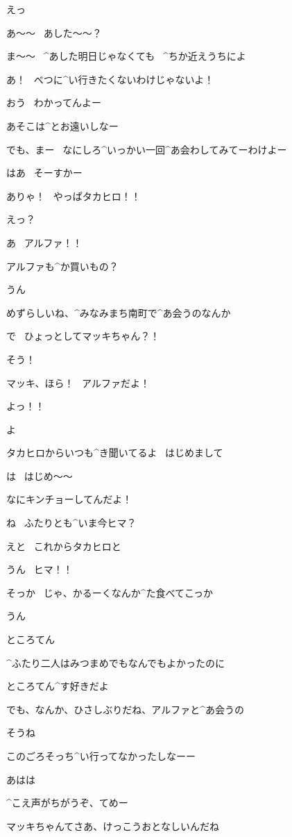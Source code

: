 \M えっ

\M あ〜〜
\ あした〜〜？

\page
\T ま〜〜
\ ^{あした}{明日}じゃなくても
\ ^{ちか}{近}えうちによ

\M あ！
\ べつに^{い}{行}きたくないわけじゃないよ！

\T おう
\ わかってんよー

\T あそこは^{とお}{遠}いしなー

\page
\T でも、まー
\ なにしろ^{いっかい}{一回}^{あ}{会}わしてみてーわけよー

\M はあ
\ そーすかー

\page
\A ありゃ！
\ やっぱタカヒロ！！

\T えっ？

\T あ
\ アルファ！！

\page
\T アルファも^{か}{買}いもの？

\A うん

\A めずらしいね、^{みなみまち}{南町}で^{あ}{会}うのなんか

\A で
\ ひょっとしてマッキちゃん？！

\T そう！

\T マッキ、ほら！
\ アルファだよ！

\page
\M よっ！！

\A よ

\page
\A タカヒロからいつも^{き}{聞}いてるよ
\ はじめまして

\M は
\ はじめ〜〜

\T なにキンチョーしてんだよ！

\A ね
\ ふたりとも^{いま}{今}ヒマ？

\M えと
\ これからタカヒロと

\T うん
\ ヒマ！！

\A そっか
\ じゃ、かるーくなんか^{た}{食}べてこっか

\T うん

\page
\Sign ところてん

\A ^{ふたり}{二人}はみつまめでもなんでもよかったのに

\T ところてん^{す}{好}きだよ

\T でも、なんか、ひさしぶりだね、アルファと^{あ}{会}うの

\A そうね

\T このごろそっち^{い}{行}ってなかったしなーー

\T あはは

\M ^{こえ}{声}がちがうぞ、てめー

\page
\A マッキちゃんてさあ、けっこうおとなしいんだね

